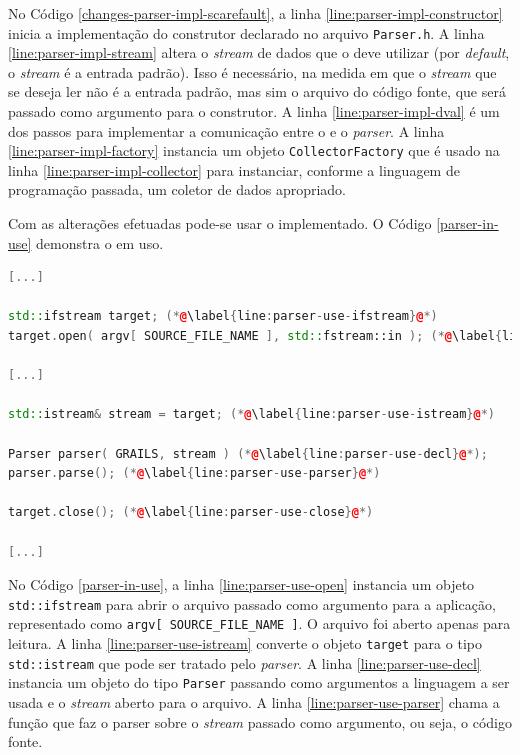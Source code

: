 No Código \ref{changes-parser-impl-scarefault}, a linha \ref{line:parser-impl-constructor}
inicia a implementação do construtor declarado no arquivo \lstinline|Parser.h|.
A linha \ref{line:parser-impl-stream} altera o \textit{stream} de dados que
o \parser deve utilizar (por \textit{default}, o \textit{stream} é a entrada
padrão). Isso é necessário, na medida em que o \textit{stream} que se deseja
ler não é a entrada padrão, mas sim o arquivo do código fonte, que será
passado como argumento para o construtor. A linha
\ref{line:parser-impl-dval} é um dos passos para implementar a comunicação
entre o \scanner e o \textit{parser}. A linha \ref{line:parser-impl-factory}
instancia um objeto \lstinline|CollectorFactory| que é usado na linha
\ref{line:parser-impl-collector} para instanciar, conforme a linguagem de
programação passada, um coletor de dados apropriado.

Com as alterações efetuadas pode-se usar o \parser implementado. O Código
\ref{parser-in-use} demonstra o \parser em uso.

\begin{lstlisting}[language=C++, label=parser-in-use, caption=\textit{Parser} em uso]
[...]

std::ifstream target; (*@\label{line:parser-use-ifstream}@*)
target.open( argv[ SOURCE_FILE_NAME ], std::fstream::in ); (*@\label{line:parser-use-open}@*)

[...]

std::istream& stream = target; (*@\label{line:parser-use-istream}@*)

Parser parser( GRAILS, stream ) (*@\label{line:parser-use-decl}@*);
parser.parse(); (*@\label{line:parser-use-parser}@*)

target.close(); (*@\label{line:parser-use-close}@*)

[...]
\end{lstlisting}

No Código \ref{parser-in-use}, a linha \ref{line:parser-use-open} instancia um
objeto \lstinline|std::ifstream| para abrir o arquivo passado como argumento para
a aplicação, representado como \lstinline|argv[ SOURCE_FILE_NAME ]|. O arquivo foi
aberto apenas para leitura. A linha \ref{line:parser-use-istream} converte o
objeto \lstinline|target| para o tipo \lstinline|std::istream| que pode ser tratado
pelo \textit{parser}. A linha \ref{line:parser-use-decl} instancia um objeto do
tipo \lstinline|Parser| passando como argumentos a linguagem a ser usada e o
\textit{stream} aberto para o arquivo. A linha \ref{line:parser-use-parser} chama
a função que faz o {parser} sobre o \textit{stream} passado como argumento, ou seja,
o código fonte.

